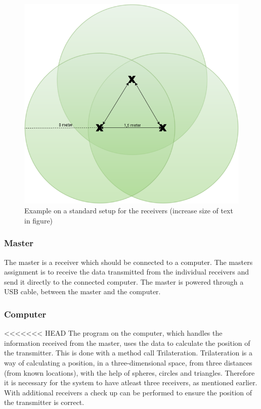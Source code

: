 \begin{figure}[H]
	\centering
	\includegraphics[scale=0.5]{figures/ReceiverSetup.png}
	\caption{Example on a standard setup for the receivers (increase size of text in figure)}
	\label{receiverSetup}
	\flushleft
\end{figure}

\subsubsection{Master}
The master is a receiver which should be connected to a computer. The masters assignment is to receive the data transmitted from the individual receivers and send it directly to the connected computer. The master is powered through a USB cable, between the master and the computer.
\subsubsection{Computer}
<<<<<<< HEAD
The program on the computer, which handles the information received from the master, uses the data to calculate the position of the transmitter. This is done with a method call Trilateration. Trilateration is a way of calculating a position, in a three-dimensional space, from three distances (from known locations), with the help of spheres, circles and triangles. Therefore it is necessary for the system to have atleast three receivers, as mentioned earlier. With additional receivers a check up can be performed to ensure the position of the transmitter is correct.\\\\

